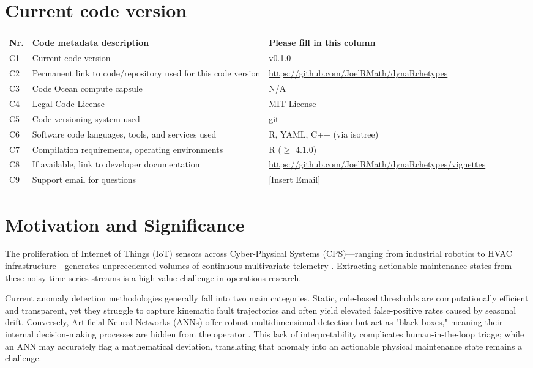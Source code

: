 \documentclass[final,3p,times]{elsarticle}
\begin{document}
\section*{Current code version}
\begin{table}[!h]
\begin{tabular}{|l|p{6.5cm}|p{6.5cm}|}
\hline
\textbf{Nr.} & \textbf{Code metadata description} & \textbf{Please fill in this column} \\
\hline
C1 & Current code version & v0.1.0 \\
\hline
C2 & Permanent link to code/repository used for this code version & \url{https://github.com/JoelRMath/dynaRchetypes} \\
\hline
C3 & Code Ocean compute capsule & N/A \\
\hline
C4 & Legal Code License & MIT License \\
\hline
C5 & Code versioning system used & git \\
\hline
C6 & Software code languages, tools, and services used & R, YAML, C++ (via isotree) \\
\hline
C7 & Compilation requirements, operating environments & R ($\ge$ 4.1.0) \\
\hline
C8 & If available, link to developer documentation & \url{https://github.com/JoelRMath/dynaRchetypes/vignettes} \\
\hline
C9 & Support email for questions & [Insert Email] \\
\hline
\end{tabular}
\end{table}

\section{Motivation and Significance}

The proliferation of Internet of Things (IoT) sensors across Cyber-Physical Systems (CPS)—ranging from industrial robotics to HVAC infrastructure—generates unprecedented volumes of continuous multivariate telemetry \cite{cook2019anomaly}. Extracting actionable maintenance states from these noisy time-series streams is a high-value challenge in operations research.

Current anomaly detection methodologies generally fall into two main categories. Static, rule-based thresholds are computationally efficient and transparent, yet they struggle to capture kinematic fault trajectories and often yield elevated false-positive rates caused by seasonal drift. Conversely, Artificial Neural Networks (ANNs) offer robust multidimensional detection but act as "black boxes," meaning their internal decision-making processes are hidden from the operator \cite{blazquez2021review}. This lack of interpretability complicates human-in-the-loop triage; while an ANN may accurately flag a mathematical deviation, translating that anomaly into an actionable physical maintenance state remains a challenge.
\end{document}

